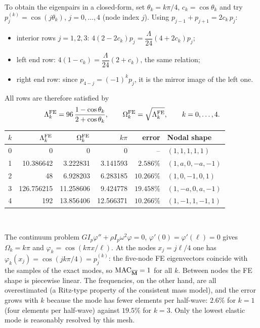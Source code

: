 \documentclass[12pt]{article}
\begin{document}
\begin{enumerate}
          To obtain the eigenpairs in a closed-form, set $\theta_k=k\pi/4$, $c_k=\cos\theta_k$ and try $p^{(k)}_j=\cos(j\theta_k)$, $j=0,\dots,4$ (node index $j$). Using $p_{j-1}+p_{j+1}=2c_k\,p_j$:
          \begin{itemize}
              \item interior rows $j=1,2,3$: $4(2-2c_k)p_j=\dfrac{\Lambda}{24}(4+2c_k)p_j$;
              \item left end row: $4(1-c_k)=\dfrac{\Lambda}{24}(2+c_k)$, the same relation;
              \item right end row: since $p_{4-j}=(-1)^kp_j$, it is the mirror image of the left one.
          \end{itemize}
          All rows are therefore satisfied by
          \[
              \Lambda_k^{\rm FE}=96\,\frac{1-\cos\theta_k}{2+\cos\theta_k},
              \qquad \Omega_k^{\rm FE}=\sqrt{\Lambda_k^{\rm FE}},\qquad k=0,\ldots,4 .
          \]
          \begin{center}
              \small\setlength{\tabcolsep}{3pt}
              \begin{tabular}{@{}crrrrl@{}}
                  \toprule
                  $k$ & $\Lambda^{\rm FE}_k$ & $\Omega^{\rm FE}_k$ & $k\pi$    & error      & Nodal shape     \\
                  \midrule
                  0   & 0                    & 0                   & 0         & --         & $(1,1,1,1,1)$   \\
                  1   & 10.386642            & 3.222831            & 3.141593  & $2.586\%$  & $(1,a,0,-a,-1)$ \\
                  2   & 48                   & 6.928203            & 6.283185  & $10.266\%$ & $(1,0,-1,0,1)$  \\
                  3   & 126.756215           & 11.258606           & 9.424778  & $19.458\%$ & $(1,-a,0,a,-1)$ \\
                  4   & 192                  & 13.856406           & 12.566371 & $10.266\%$ & $(1,-1,1,-1,1)$ \\
                  \bottomrule
              \end{tabular}\\[-1pt]
          \end{center}
          The continuum problem $GI_p\varphi''+\rho I_p\omega^2\varphi=0$, $\varphi'(0)=\varphi'(\ell)=0$ gives $\Omega_k=k\pi$ and $\varphi_k=\cos(k\pi x/\ell)$. At the nodes $x_j=j\ell/4$ one has $\varphi_k(x_j)=\cos(jk\pi/4)=p_j^{(k)}$: the five-node FE eigenvectors coincide with the samples of the exact modes, so $\mathrm{MAC}_{\overline{\mathbf M}}=1$ for all $k$. Between nodes the FE shape is piecewise linear. The frequencies, on the other hand, are all overestimated (a Ritz-type property of the consistent mass model), and the error grows with $k$ because the mode has fewer elements per half-wave: $2.6\%$ for $k=1$ (four elements per half-wave) against $19.5\%$ for $k=3$. Only the lowest elastic mode is reasonably resolved by this mesh.

\end{enumerate}
\end{document}
